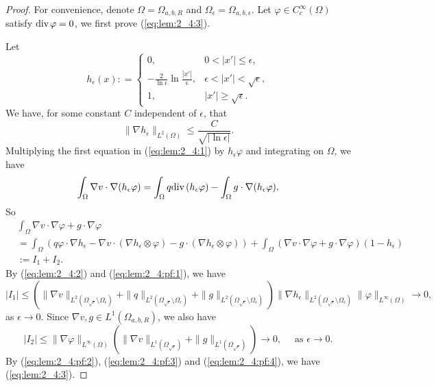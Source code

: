 \documentclass[12pt]{article}
\newcommand{\dive}{{\rm div \hspace{0.05cm} }}
\begin{document}
\begin{proof}
	For convenience, denote $\Omega=\Omega_{a, b, R}$ and $\Omega_{\epsilon}=\Omega_{a, b, \epsilon}$. Let $\varphi\in C_c^{\infty}(\Omega)$ satisfy $\dive \varphi=0$, we first prove (\ref{eq:lem:2_4:3}). 

	Let 
	\[
		h_{\epsilon}(x): =
		\left\{
		\begin{array}{ll}
			0, & 0<|x'| \le \epsilon,\\
			\displaystyle -\frac{2}{\ln \epsilon}\ln \frac{|x'|}{\epsilon}, & \epsilon<|x'|<\sqrt{\epsilon},\\
			1, & |x'| \ge \sqrt{\epsilon}.
		\end{array}
		\right.
	\]
	We have, for some constant $C$ independent of $\epsilon$, that
	\begin{equation}\label{eq:lem:2_4:pf:1}
		\|\nabla h_{\epsilon}\|_{L^2(\Omega)}\le \frac{C}{\sqrt{| \ln \epsilon|}}.
	\end{equation}
	Multiplying the first equation in (\ref{eq:lem:2_4:1}) by $h_{\epsilon}\varphi$ and integrating on $\Omega$, we have 
	\[
		\int_{\Omega}\nabla v\cdot \nabla (h_{\epsilon}\varphi)=\int_{\Omega} q\dive (h_{\epsilon}\varphi)-\int_{\Omega}g\cdot \nabla(h_{\epsilon}\varphi).
	\]
	So 
	\begin{equation}\label{eq:lem:2_4:pf:2}
	\begin{split}
		& \int_{\Omega}\nabla v\cdot \nabla \varphi
		+ g \cdot \nabla \varphi\\
		& =\int_{\Omega} \left(q\varphi\cdot \nabla h_{\epsilon}-\nabla v\cdot (\nabla h_{\epsilon}\otimes\varphi)
		- g\cdot (\nabla h_{\epsilon}\otimes\varphi) \right) 
		+\int_{\Omega}(\nabla v\cdot \nabla \varphi
		+g \cdot\nabla\varphi)(1-h_{\epsilon})\\
		& :=I_1+I_2. 
	\end{split}
	\end{equation}
	By (\ref{eq:lem:2_4:2}) and (\ref{eq:lem:2_4:pf:1}), we have 
	\begin{equation}\label{eq:lem:2_4:pf:3}
		|I_1|\le (\|\nabla v\|_{L^2(\Omega_{\sqrt{\epsilon}}\setminus\Omega_{\epsilon})}+\|q\|_{L^2(\Omega_{\sqrt{\epsilon}}\setminus\Omega_{\epsilon})}+\|g\|_{L^2(\Omega_{\sqrt{\epsilon}}\setminus\Omega_{\epsilon})})\|\nabla h_{\epsilon}\|_{L^2(\Omega_{\sqrt{\epsilon}}\setminus\Omega_{\epsilon})}\|\varphi\|_{L^{\infty}(\Omega)}\to 0, 
	\end{equation}
	as $\epsilon\to 0$. Since $\nabla v, g\in L^1(\Omega_{a, b, R})$, we also have 
	\begin{equation}\label{eq:lem:2_4:pf:4}
		|I_2|\le \|\nabla \varphi\|_{L^{\infty}(\Omega)}(\|\nabla v\|_{L^1(\Omega_{\sqrt{\epsilon}})} 
		+\|g\|_{L^1(\Omega_{\sqrt{\epsilon}})})\to 0, \quad \textrm{ as }\epsilon\to 0.
	\end{equation}
	By (\ref{eq:lem:2_4:pf:2}), (\ref{eq:lem:2_4:pf:3}) and (\ref{eq:lem:2_4:pf:4}), we have (\ref{eq:lem:2_4:3}). 
	

\end{proof}
\end{document}
